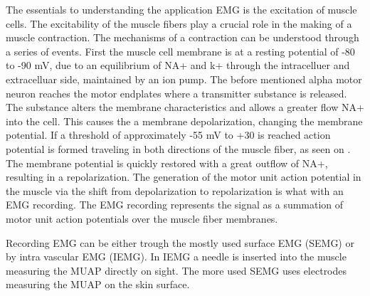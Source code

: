 The essentials to understanding the application EMG is the excitation of muscle cells. The excitability of the muscle fibers play a crucial role in the making of a muscle contraction. The mechanisms of a contraction can be understood through a series of events. First the muscle cell membrane is at a resting potential of -80 to -90 mV, due to an equilibrium of NA+ and k+ through the intracelluer and extracelluar side, maintained by an ion pump. The before mentioned alpha motor neuron reaches the motor endplates where a transmitter substance is released. The substance alters the membrane characteristics and allows a greater flow NA+ into the cell. This causes the a membrane depolarization, changing the membrane potential. If a threshold of approximately -55 mV to +30 is reached action potential is formed traveling in both directions of the muscle fiber, as seen on . The membrane potential is quickly restored with a great outflow of NA+, resulting in a repolarization. The generation of the motor unit action potential in the muscle via the shift from depolarization to repolarization is what with an EMG recording. The EMG recording represents the signal as a summation of motor unit action potentials over the muscle fiber membranes.\cite{Cram2012,Martini2012} 

Recording EMG can be either trough the mostly used surface EMG (SEMG) or by intra vascular EMG (IEMG). In IEMG a needle is inserted into the muscle measuring the MUAP directly on sight. The more used SEMG uses electrodes measuring the MUAP on the skin surface.\cite{Cram2012} 




 
 




